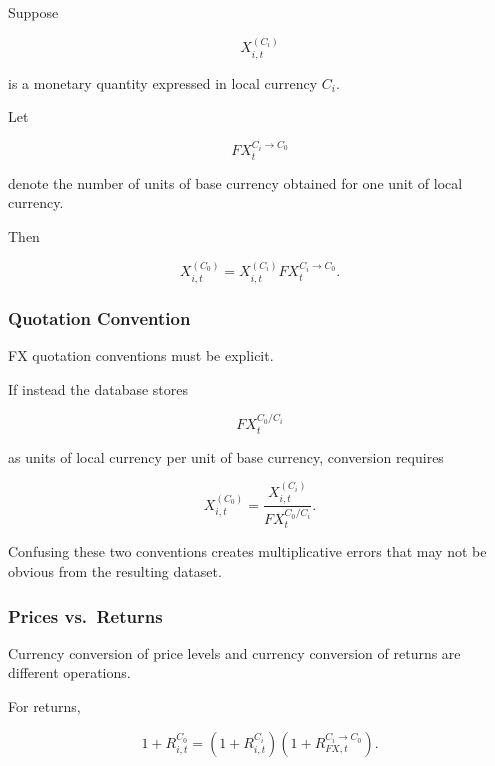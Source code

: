 \documentclass[11pt,a4paper]{article}
\begin{document}
Suppose

\begin{equation}
X_{i,t}^{(C_i)}
\end{equation}

is a monetary quantity expressed in local currency $C_i$.

Let

\begin{equation}
FX_t^{C_i\rightarrow C_0}
\end{equation}

denote the number of units of base currency obtained for one unit of local
currency.

Then

\begin{equation}
\boxed{
X_{i,t}^{(C_0)}
=
X_{i,t}^{(C_i)}
FX_t^{C_i\rightarrow C_0}.
}
\end{equation}


\subsubsection{Quotation Convention}

FX quotation conventions must be explicit.

If instead the database stores

\begin{equation}
FX_t^{C_0/C_i}
\end{equation}

as units of local currency per unit of base currency, conversion requires

\begin{equation}
X_{i,t}^{(C_0)}
=
\frac{
X_{i,t}^{(C_i)}
}{
FX_t^{C_0/C_i}
}.
\end{equation}

Confusing these two conventions creates multiplicative errors that may not be
obvious from the resulting dataset.


\subsubsection{Prices vs.\ Returns}

Currency conversion of price levels and currency conversion of returns are
different operations.

For returns,

\begin{equation}
1+R_{i,t}^{C_0}
=
\left(
1+R_{i,t}^{C_i}
\right)
\left(
1+R_{FX,t}^{C_i\rightarrow C_0}
\right).
\end{equation}
\end{document}
